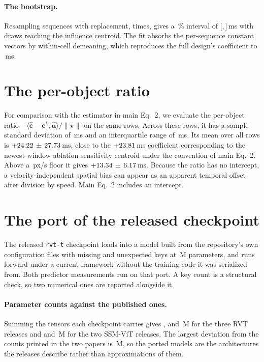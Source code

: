 \documentclass[10pt,twocolumn,letterpaper]{article}
\begin{document}
\paragraph{The bootstrap.} Resampling sequences with replacement,
\outBootDraws{} times, gives a \bootCI\,\% interval of
[\outBootLo,\,\outBootHi]\,ms with \outBootBeyond{} draws reaching the influence
centroid. The fit absorbs the per-sequence constant vectors by within-cell
demeaning, which reproduces the full design’s coefficient to \fwlAgree\,ms.

\section{The per-object ratio}
\label{sup:ratio}

For comparison with the estimator in main Eq.~2, we evaluate the per-object ratio
$-\langle\hat{\mathbf c}-\mathbf c^{*},\hat{\mathbf u}\rangle/\lVert \tilde{\mathbf v}\rVert$
on the same \outMatches{} rows. Across these rows, it has a sample standard deviation
of \ratioSD\,ms and an
interquartile range of \ratioIQR\,ms. Its mean over all rows is
$+24.22\,\pm\,27.73$\,ms, close to the $+23.81$\,ms coefficient
corresponding to the newest-window ablation-sensitivity centroid under the convention
of main Eq.~2. Above a \ratioFloorSpeed\,px/s floor it gives
$+13.34\,\pm\,6.17$\,ms. Because the ratio has no intercept, a
velocity-independent spatial bias can appear as an apparent temporal offset after division
by speed. Main Eq.~2 includes an intercept.

\section{The port of the released checkpoint}
\label{sup:port}

The released \texttt{rvt-t} checkpoint loads into a model built from the
repository's own configuration files with \rvtMissingKeys{} missing and
\rvtUnexpectedKeys{} unexpected keys at \rvtParams\,M parameters, and runs
forward under a current framework without the training code it was serialized
from. Both predictor measurements run on that port. A key count is a structural
check, so two numerical ones are reported alongside it.

\paragraph{Parameter counts against the published ones.} Summing the tensors each
checkpoint carries gives \rvtParams{}, \capParamsS{} and \capParamsB\,M for the three RVT
releases and \ssmParamsS{} and \ssmParamsB\,M for the two SSM-ViT releases. The largest
deviation from the counts printed in the two papers is \portParamDev\,M, so the ported
models are the architectures the releases describe rather than approximations of them.
\end{document}
